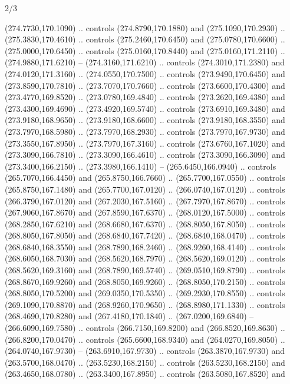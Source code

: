 \begin{flagdescription}{2/3}
\begin{scope}[xshift=0.5\flaglength,yshift=0.5\flagwidth,scale=\flagwidth/259.2]
\begin{scope}[y=0.8pt, x=0.8pt, yscale=-1,shift={(-243,-162)}]
      (274.7730,170.1090) .. controls (274.8790,170.1880) and (275.1090,170.2930) ..
      (275.3830,170.4610) .. controls (275.2460,170.6450) and (275.0780,170.6600) ..
      (275.0000,170.6450) .. controls (275.0160,170.8440) and (275.0160,171.2110) ..
      (274.9880,171.6210) -- (274.3160,171.6210) .. controls (274.3010,171.2380) and
      (274.0120,171.3160) .. (274.0550,170.7500) .. controls (273.9490,170.6450) and
      (273.8590,170.7810) .. (273.7070,170.7660) .. controls (273.6600,170.4300) and
      (273.4770,169.8520) .. (273.0780,169.4840) .. controls (273.2620,169.4380) and
      (273.4300,169.4690) .. (273.4920,169.5740) .. controls (273.6910,169.3480) and
      (273.9180,168.9650) .. (273.9180,168.6600) .. controls (273.9180,168.3550) and
      (273.7970,168.5980) .. (273.7970,168.2930) .. controls (273.7970,167.9730) and
      (273.3550,167.8950) .. (273.7970,167.3160) .. controls (273.6760,167.1020) and
      (273.3090,166.7810) .. (273.3090,166.4610) .. controls (273.3090,166.3090) and
      (273.3400,166.2150) .. (273.3980,166.1410) -- (265.6450,166.0940) .. controls
      (265.7070,166.4450) and (265.8750,166.7660) .. (265.7700,167.0550) .. controls
      (265.8750,167.1480) and (265.7700,167.0120) .. (266.0740,167.0120) .. controls
      (266.3790,167.0120) and (267.2030,167.5160) .. (267.7970,167.8670) .. controls
      (267.9060,167.8670) and (267.8590,167.6370) .. (268.0120,167.5000) .. controls
      (268.2850,167.6210) and (268.6680,167.6370) .. (268.8050,167.8050) .. controls
      (268.8050,167.8050) and (268.6840,167.7420) .. (268.6840,168.0470) .. controls
      (268.6840,168.3550) and (268.7890,168.2460) .. (268.9260,168.4140) .. controls
      (268.6050,168.7030) and (268.5620,168.7970) .. (268.5620,169.0120) .. controls
      (268.5620,169.3160) and (268.7890,169.5740) .. (269.0510,169.8790) .. controls
      (268.8670,169.9260) and (268.8050,169.9260) .. (268.8050,170.2150) .. controls
      (268.8050,170.5200) and (269.0350,170.5350) .. (269.2930,170.8550) .. controls
      (269.1090,170.8870) and (268.9260,170.9650) .. (268.8980,171.1330) .. controls
      (268.4690,170.8280) and (267.4180,170.1840) .. (267.0200,169.6840) --
      (266.6090,169.7580) .. controls (266.7150,169.8200) and (266.8520,169.8630) ..
      (266.8200,170.0470) .. controls (265.6600,168.9340) and (264.0270,169.8050) ..
      (264.0740,167.9730) -- (263.6910,167.9730) .. controls (263.3870,167.9730) and
      (263.5700,168.0470) .. (263.5230,168.2150) .. controls (263.5230,168.2150) and
      (263.4650,168.0780) .. (263.3400,167.8950) .. controls (263.5080,167.8520) and

\end{scope}
\end{scope}
\end{flagdescription}
